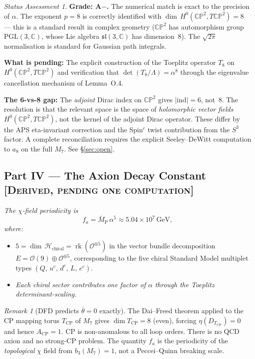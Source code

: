 \documentclass[11pt]{article}
\theoremstyle{definition}
\theoremstyle{remark}
\newtheorem*{remark}{Remark}
\newtheorem*{status}{Status Assessment}
\newcommand{\CP}{\mathbb{CP}}
\newcommand{\MPbar}{\bar{M}_{\mathrm{P}}}
\newcommand{\rk}{\operatorname{rk}}
\newcommand{\GeV}{\,\mathrm{GeV}}
\begin{document}
\begin{status}
\textbf{Grade: A$-$.}  The numerical match is exact to the precision
of $\alpha$.  The exponent $p = 8$ is correctly identified with
$\dim\,H^0(\CP^2, T\CP^2) = 8$ --- this is a standard result in
complex geometry ($\CP^2$ has automorphism group $\mathrm{PGL}(3,\mathbb{C})$,
whose Lie algebra $\mathfrak{sl}(3,\mathbb{C})$ has dimension~$8$).
The $\sqrt{2\pi}$ normalisation is standard for Gaussian path integrals.

\textbf{What is pending:} The explicit construction of the Toeplitz
operator $T_8$ on $H^0(\CP^2, T\CP^2)$ and verification that
$\det(T_8/\Lambda) = \alpha^{8}$ through the eigenvalue cancellation
mechanism of Lemma~O.4.

\textbf{The 6-vs-8 gap:} The \emph{adjoint} Dirac index on $\CP^2$
gives $|\mathrm{ind}| = 6$, not~$8$.  The resolution is that the
relevant space is the space of \emph{holomorphic vector fields}
$H^0(\CP^2, T\CP^2)$, not the kernel of the adjoint Dirac operator.
These differ by the APS eta-invariant correction and the
Spin$^c$ twist contribution from the $S^3$ factor.  A complete
reconciliation requires the explicit Seeley--DeWitt computation
to $a_8$ on the full $M_7$.  See \S\ref{sec:open}.
\end{status}


\subsection*{Part IV --- The Axion Decay Constant%
\hfill\normalfont\textsc{[Derived, pending one computation]}}

\textit{The $\chi$-field periodicity is}
\begin{equation}\label{eq:fa}
  f_a = \MPbar\,\alpha^{5} \approx 5.04 \times 10^{7}\GeV,
\end{equation}
\textit{where:}
\begin{itemize}
\item $5 = \dim\,\mathcal{H}_{\mathrm{chiral}}
  = \rk(\mathcal{O}^{\oplus 5})$ in the vector bundle decomposition
  $E = \mathcal{O}(9) \oplus \mathcal{O}^{\oplus 5}$, corresponding to
  the five chiral Standard Model multiplet types
  $(Q,\, u^c,\, d^c,\, L,\, e^c)$.
\item \textit{Each chiral sector contributes one factor of $\alpha$
  through the Toeplitz determinant-scaling.}
\end{itemize}

\begin{remark}[DFD predicts $\bar\theta = 0$ exactly]
The Dai--Freed theorem applied to the CP mapping torus
$T_{\mathrm{CP}}$ of $M_7$ gives $\dim T_{\mathrm{CP}} = 8$ (even),
forcing $\eta(D_{T_{\mathrm{CP}}}) = 0$ and hence
$A_{\mathrm{CP}} = 1$.  CP is non-anomalous to all loop orders.
There is no QCD axion and no strong-CP problem.  The quantity $f_a$
is the periodicity of the \emph{topological} $\chi$ field from
$b_3(M_7) = 1$, not a Peccei--Quinn breaking scale.
\end{remark}
\end{document}
